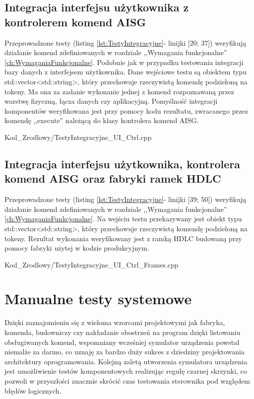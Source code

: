     \subsection{Integracja interfejsu użytkownika z kontrolerem komend AISG}
    Przeprowadzone testy (listing \ref{lst:TestyIntegracyjne}- linijki [20; 37]) weryfikują działanie komend zdefiniowanych w rozdziale ,,Wymagania funkcjonalne''
    \ref{ch:WymaganiaFunkcjonalne}.
    Podobnie jak w przypadku testowania integracji bazy danych z interfejsem użytkownika. Dane wejściowe testu są obiektem typu std::vector<std::string>, który przechowuje
    rzeczywistą komendę podzieloną na tokeny. Ma ona za zadanie wykonanie jednej z komend rozpoznawaną przez warstwę fizyczną, łącza danych czy aplikacyjną.
    Pomyślność integracji komponentów weryfikowana jest przy pomocy kodu rezultatu, zwracanego przez komendę ,,execute'' należącą do klasy kontrolera komend AISG.
    
        {Kod_Zrodlowy/TestyIntegracyjne_UI_Ctrl.cpp}
\newpage

    \subsection{Integracja interfejsu użytkownika, kontrolera komend AISG oraz fabryki ramek HDLC}
    Przeprowadzone testy (listing \ref{lst:TestyIntegracyjne}- linijki [39; 50]) weryfikują działanie komend zdefiniowanych w rozdziale ,,Wymagania funkcjonalne''
    \ref{ch:WymaganiaFunkcjonalne}.
    Na wejściu testu przekazywany jest obiekt typu std::vector<std::string>, który przechowuje rzeczywistą komendę podzieloną na tokeny. Rezultat wykonania
    weryfikowany jest z ramką HDLC budowaną przy pomocy fabryki użytej w kodzie produkcyjnym.
    
        {Kod_Zrodlowy/TestyIntegracyjne_UI_Ctrl_Frames.cpp}
\section{Manualne testy systemowe}
 Dzięki zaznajomieniu się z wieloma wzorcami projektowymi jak fabryka, komenda, budowniczy czy nakładanie obostrzeń na program dzięki listowaniu obsługiwanych komend, 
    wspomniany wcześniej symulator urządzenia powstał niemalże za darmo, co uznaję za bardzo duży sukces z dziedziny projektowania architektury oprogramowania.
    Kolejną zaletą utworzenia symulatora urządzenia jest umożliwienie testów komponentowych realizując regułę czarnej skrzynki, co pozwoli w przyszłości
    znacznie skrócić czas testowania sterownika pod względem błędów logicznych.
